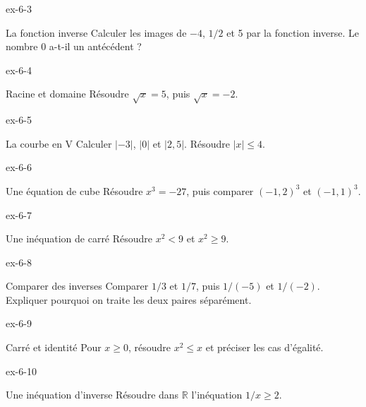 \begin{blocLivre}{ex-6-3}
\begin{exercice}[1]{La fonction inverse}
Calculer les images de $-4$, $1/2$ et 5 par la fonction inverse. Le nombre 0 a-t-il un antécédent ?
\label{fig-ex-6-3}
\end{exercice}
\end{blocLivre}
\begin{blocLivre}{ex-6-4}
\begin{exercice}[1]{Racine et domaine}
Résoudre $\sqrt x=5$, puis $\sqrt x=-2$.
\label{fig-ex-6-4}
\end{exercice}
\end{blocLivre}
\begin{blocLivre}{ex-6-5}
\begin{exercice}[1]{La courbe en V}
Calculer $|-3|$, $|0|$ et $|2{,}5|$. Résoudre $|x|\le4$.
\label{fig-ex-6-5}
\end{exercice}
\end{blocLivre}

\clearpage{}
\begin{blocLivre}{ex-6-6}
\begin{exercice}[2]{Une équation de cube}
Résoudre $x^3=-27$, puis comparer $(-1{,}2)^3$ et $(-1{,}1)^3$.
\label{fig-ex-6-6}
\end{exercice}
\end{blocLivre}
\begin{blocLivre}{ex-6-7}
\begin{exercice}[2]{Une inéquation de carré}
Résoudre $x^2<9$ et $x^2\ge9$.
\label{fig-ex-6-7}
\end{exercice}
\end{blocLivre}
\begin{blocLivre}{ex-6-8}
\begin{exercice}[2]{Comparer des inverses}
Comparer $1/3$ et $1/7$, puis $1/(-5)$ et $1/(-2)$. Expliquer pourquoi on traite les deux paires séparément.
\end{exercice}
\end{blocLivre}
\begin{blocLivre}{ex-6-9}
\begin{exercice}[2]{Carré et identité}
Pour $x\ge0$, résoudre $x^2\le x$ et préciser les cas d’égalité.
\label{fig-ex-6-9}
\end{exercice}
\end{blocLivre}
\begin{blocLivre}{ex-6-10}
\begin{exercice}[2]{Une inéquation d’inverse}
Résoudre dans $\mathbb R$ l’inéquation $1/x\ge2$.
\end{exercice}
\end{blocLivre}

